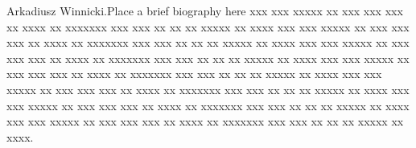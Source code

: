 \documentclass{amcs}
\begin{document}
\begin{biography}[]{Arkadiusz Winnicki.}Place a brief biography here xxx xxx xxxxx xx xxx xxx xxx xx xxxx xx xxxxxxx xxx xxx xx xx xx xxxxx xx xxxx xxx xxx xxxxx xx xxx xxx xxx xx xxxx xx xxxxxxx xxx xxx xx xx xx xxxxx xx xxxx xxx xxx xxxxx xx xxx xxx xxx xx xxxx xx xxxxxxx xxx xxx xx xx xx xxxxx xx xxxx xxx xxx xxxxx xx xxx xxx xxx xx xxxx xx xxxxxxx xxx xxx xx xx xx xxxxx xx xxxx xxx xxx xxxxx xx xxx xxx xxx xx xxxx xx xxxxxxx xxx xxx xx xx xx xxxxx xx xxxx xxx xxx xxxxx xx xxx xxx xxx xx xxxx xx xxxxxxx xxx xxx xx xx xx xxxxx xx xxxx xxx xxx xxxxx xx xxx xxx xxx xx xxxx xx xxxxxxx xxx xxx xx xx xx xxxxx xx xxxx.
\end{biography}
\end{document}
